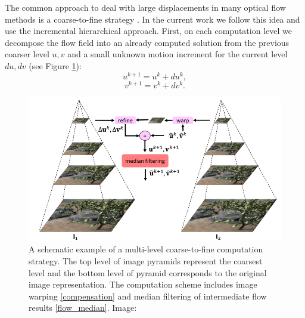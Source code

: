 The common approach to deal with large displacements in many optical flow methods is a coarse-to-fine strategy \cite{Black96, Memin98, Brox04}. In the current work we follow this idea and use the incremental hierarchical approach. First, on each computation level we decompose the flow field into an already computed solution from the previous coarser level $u,v$ and a small unknown motion increment for the current level $du,dv$ (see Figure \ref{fig:coarse_to_fine}):
$$ u^{k+1} = u^{k} + du^{k}, $$
$$ v^{k+1} = v^{k} + dv^{k}. $$
\begin{figure}[h]
  \centerline{
    \mbox{\includegraphics[scale = 0.45]{figures/coarse_to_fine.png}} 
  }
  \caption[coarse_to_fine]{A schematic example of a multi-level coarse-to-fine computation strategy. The top level of image pyramids represent the coarsest level and the bottom level of pyramid corresponds to the original image representation. The computation scheme includes image warping \ref{compensation} and median filtering of intermediate flow results \ref{flow_median}.  Image: \cite{Sun14}}
  \label{fig:coarse_to_fine}
\end{figure}

